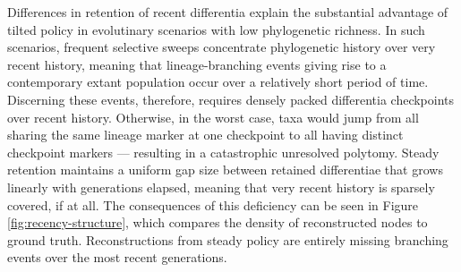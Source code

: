 Differences in retention of recent differentia explain the substantial advantage of tilted policy in evolutinary scenarios with low phylogenetic richness.
In such scenarios, frequent selective sweeps concentrate phylogenetic history over very recent history, meaning that lineage-branching events giving rise to a contemporary extant population occur over a relatively short period of time.
Discerning these events, therefore, requires densely packed differentia checkpoints over recent history.
Otherwise, in the worst case, taxa would jump from all sharing the same lineage marker at one checkpoint to all having distinct checkpoint markers --- resulting in a catastrophic unresolved polytomy.
Steady retention maintains a uniform gap size between retained differentiae that grows linearly with generations elapsed, meaning that very recent history is sparsely covered, if at all.
The consequences of this deficiency can be seen in Figure \ref{fig:recency-structure}, which compares the density of reconstructed nodes to ground truth.
Reconstructions from steady policy are entirely missing branching events over the most recent generations.


% 


